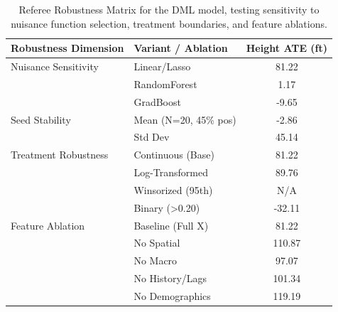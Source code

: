\begin{table}[H]
\centering
\begin{tabular}{l l c}
\toprule
\textbf{Robustness Dimension} & \textbf{Variant / Ablation} & \textbf{Height ATE (ft)} \\
\midrule
Nuisance Sensitivity & Linear/Lasso & 81.22 \\
 & RandomForest & 1.17 \\
 & GradBoost & -9.65 \\
Seed Stability & Mean (N=20, 45\% pos) & -2.86 \\
 & Std Dev & 45.14 \\
Treatment Robustness & Continuous (Base) & 81.22 \\
 & Log-Transformed & 89.76 \\
 & Winsorized (95th) & N/A \\
 & Binary (>0.20) & -32.11 \\
Feature Ablation & Baseline (Full X) & 81.22 \\
 & No Spatial & 110.87 \\
 & No Macro & 97.07 \\
 & No History/Lags & 101.34 \\
 & No Demographics & 119.19 \\
\bottomrule
\end{tabular}
\caption{Referee Robustness Matrix for the DML model, testing sensitivity to nuisance function selection, treatment boundaries, and feature ablations.}
\label{tab:referee_robustness}
\end{table}
